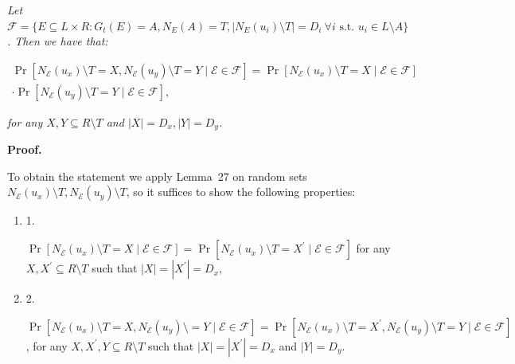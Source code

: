 \documentclass[10pt,a4paper]{article}
\begin{document}
\emph{Let $\mathscr{F}=\{E\subseteq L\times R:G_{t}(E)=A,N_{E}(A)=T,|N_{E}(u_{i})\setminus T|=D_{i}\ \forall i\text{ s.t. }u_{i}\in L\setminus A\}$.
Then we have that:}\par


\[\begin{gathered}
\displaystyle\Pr[N_{\mathcal{E}}(u_{x})\setminus T=X,N_{\mathcal{E}}(u_{y})\setminus T=Y\mid\mathcal{E}\in\mathscr{F}]= \displaystyle\Pr[N_{\mathcal{E}}(u_{x})\setminus T=X\mid\mathcal{E}\in\mathscr{F}] \\
\displaystyle\cdot\Pr[N_{\mathcal{E}}(u_{y})\setminus T=Y\mid\mathcal{E}\in\mathscr{F}],
\end{gathered}\]


\emph{for any $X,Y\subseteq R\setminus T$ and $|X|=D_{x},|Y|=D_{y}$.}\par






\par\medskip\noindent\textbf{Proof.}\par



To obtain the statement we apply Lemma 27 on random sets $N_{\mathcal{E}}(u_{x})\setminus T,N_{\mathcal{E}}(u_{y})\setminus T$, so it suffices to show the following properties:\par


\begin{enumerate}


\item[] 1. 


$\Pr[N_{\mathcal{E}}(u_{x})\setminus T=X\mid\mathcal{E}\in\mathscr{F}]=\Pr[N_{\mathcal{E}}(u_{x})\setminus T=X^{\prime}\mid\mathcal{E}\in\mathscr{F}]$ for any $X,X^{\prime}\subseteq R\setminus T$ such that $|X|=|X^{\prime}|=D_{x}$,\par




\item[] 2. 


$\Pr[N_{\mathcal{E}}(u_{x})\setminus T=X,N_{\mathcal{E}}(u_{y})\setminus=Y\mid\mathcal{E}\in\mathscr{F}]=\Pr[N_{\mathcal{E}}(u_{x})\setminus T=X^{\prime},N_{\mathcal{E}}(u_{y})\setminus T=Y\mid\mathcal{E}\in\mathscr{F}]$, for any $X,X^{\prime},Y\subseteq R\setminus T$ such that $|X|=|X^{\prime}|=D_{x}$ and $|Y|=D_{y}$.\par




\end{enumerate}
\end{document}
